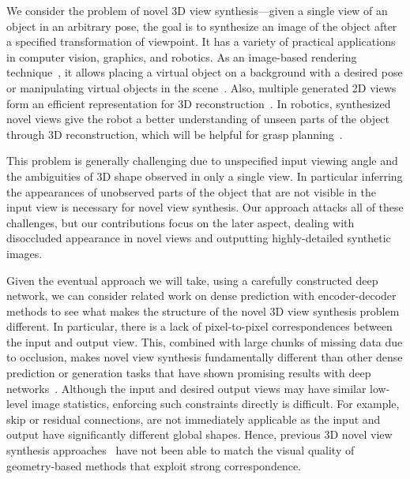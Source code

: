 \documentclass[10pt,twocolumn,letterpaper]{article}
\begin{document}
We consider the problem of novel 3D view synthesis---given a single view of an object in an arbitrary pose, the goal is to synthesize an image of the object after a specified transformation of viewpoint. It has a variety of practical applications in computer vision, graphics, and robotics. As an image-based rendering technique~\cite{kang_2000}, it allows placing a virtual object on a background with a desired pose or manipulating virtual objects in the scene~\cite{OM3D2014}. Also, multiple generated 2D views form an efficient representation for 3D reconstruction~\cite{tatarchenko_eccv2016}. In robotics, synthesized novel views give the robot a  better understanding of unseen parts of the object through 3D reconstruction, which will be helpful for grasp planning~\cite{Varley_arxiv2016}. 

This problem is generally challenging due to unspecified input viewing angle and the ambiguities of 3D shape observed in only a single view.  In particular inferring the appearances of unobserved parts of the object that are not visible in the input view is necessary for novel view synthesis.  Our approach attacks all of these challenges, but our contributions focus on the later aspect, dealing with disoccluded appearance in novel views and outputting highly-detailed synthetic images.


Given the eventual approach we will take, using a carefully constructed deep network, we can consider related work on dense prediction with encoder-decoder methods to see what makes the structure of the novel 3D view synthesis problem different.  In particular, there is a lack of pixel-to-pixel correspondences between the input and output view. This, combined with large chunks of missing data due to occlusion, makes novel view synthesis fundamentally different than other dense prediction or generation tasks that have shown promising results with deep networks~\cite{noh_iccv2015, dosovitskiy2015flownet, johnson_eccv2016}. Although the input and desired output views may have similar low-level image statistics, enforcing such constraints directly is difficult.  For example, skip or residual connections, are not immediately applicable as the input and output have significantly different global shapes. Hence, previous 3D novel view synthesis approaches~\cite{yang_nips2015,tatarchenko_eccv2016} have not been able to match the visual quality of geometry-based methods that exploit strong correspondence.
\end{document}
